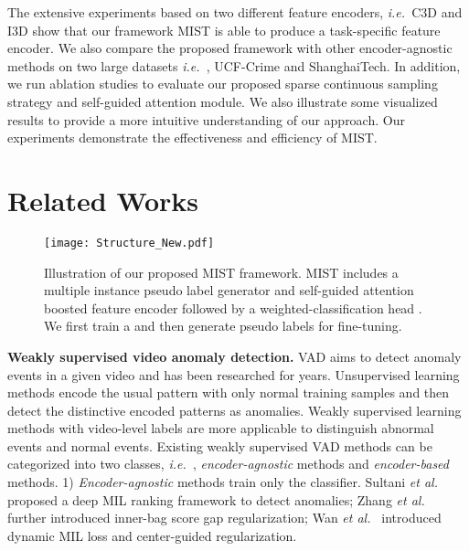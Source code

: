 \documentclass[final]{cvpr}
\newcommand{\ftst}{\textcolor[rgb]{0,0, 0}}
\newcommand{\jcst}{\textcolor[rgb]{0,0,0}}
\newcommand{\jcnd}{\textcolor[rgb]{0,0.,0}}
\newcommand{\jcgam}{\textcolor[rgb]{0.,0.,0}}
\newcommand{\jcca}{\textcolor[rgb]{0,0,0}}
\renewcommand{\ie}{\textit{i.e.\ }}
\newcommand{\et}{\textit{et al.\ }}
\begin{document}
\jcgam{The extensive experiments based on two different feature encoders, \ie C3D \cite{tran2015learning} and I3D \cite{carreira2017quo} show that our framework MIST is able to produce a task-specific feature encoder. }
\ftst{We also compare the proposed framework with other encoder-agnostic methods on two large datasets \ie, UCF-Crime \cite{sultani2018real} and ShanghaiTech\cite{luo2017revisit}. In addition, we \jcst{run} ablation studies to evaluate our proposed sparse continuous sampling strategy and self-guided attention module. We also 
illustrate some visualized results to provide a more intuitive understanding of our approach. Our experiments demonstrate the effectiveness and efficiency of MIST.}






\section{Related Works}
\begin{figure*}[ht]
    \centering
    \texttt{[image: Structure\_New.pdf]}
    \vspace{-0.1cm}
    \caption{Illustration of our proposed MIST framework. MIST includes a multiple instance pseudo label generator  and self-guided attention boosted feature encoder  followed by a weighted-classification head . We first train a  and then generate pseudo labels for  fine-tuning.}
    \vspace{-0.1cm}
    \label{fig:Strucutre}
\end{figure*}
\noindent \textbf{Weakly supervised video anomaly detection.} VAD \jcca{aims to detect anomaly events in a given video and} has been researched for years\cite{hospedales2009markov,zhao2011online,lu2013abnormal,hasan2016learning,luo2017revisit,liu2018future,liu2019margin,zhou2019anomalynet,zhong2019graph,gong2019memorizing,wan2020weakly}.
\jcst{Unsupervised learning methods \cite{hospedales2009markov,zhao2011online,hasan2016learning,zhao2017spatio,luo2017revisit,liu2018future,zhou2019anomalynet,gong2019memorizing} }
\jcgam{ encode the usual pattern with only normal training samples and then detect the distinctive encoded patterns as anomalies.}
Weakly supervised learning methods \cite{sultani2018real,zhong2019graph,zhang2019temporal,zhu2019motion,wan2020weakly} \jcnd{with video-level labels} are more applicable to distinguish abnormal events and normal events.
Existing weakly supervised VAD methods can be categorized into two classes, \ie,  \textit{encoder-agnostic} methods and \textit{encoder-based} methods. 1) \textit{Encoder-agnostic} methods train only the classifier. Sultani \et  \cite{sultani2018real} proposed a deep MIL ranking framework to detect anomalies; Zhang \et  \cite{zhang2019temporal} further introduced inner-bag score gap regularization; Wan \et  \cite{wan2020weakly} introduced dynamic MIL loss and center-guided regularization. 
\end{document}
